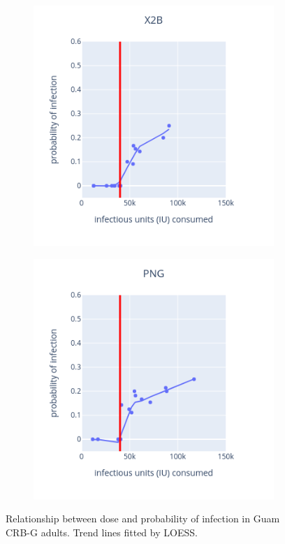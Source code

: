 \documentclass[12pt,letterpaper,english,bibliography=totocnumbered, abstract=on]{scrartcl}
\begin{document}
\begin{figure}[H]
\begin{subfigure}{.49\textwidth}
	\end{subfigure}
	\begin{subfigure}{.49\textwidth}
		\includegraphics[width=\textwidth]{images/X2B_infection_probability.png}
	\end{subfigure}
	\begin{subfigure}{.49\textwidth}
		\includegraphics[width=\textwidth]{images/PNG_infection_probability.png}
	\end{subfigure}
	\caption{Relationship between dose and probability of infection in Guam CRB-G adults. Trend lines fitted by LOESS.}
	\label{fig:infection probability}
\end{figure}
\end{document}
